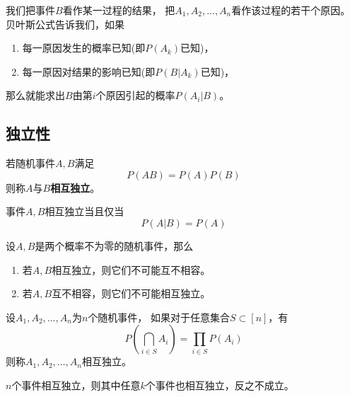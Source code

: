 \begin{remark}
  我们把事件$B$看作某一过程的结果，
  把$A_1,A_2,\dots,A_n$看作该过程的若干个原因。
  贝叶斯公式告诉我们，如果
  \begin{enumerate}
    \item
    每一原因发生的概率已知(即$P(A_k)$已知)，
    \item
    每一原因对结果的影响已知(即$P(B|A_k)$已知)，
  \end{enumerate}
  那么就能求出$B$由第$i$个原因引起的概率$P(A_i|B)$。
\end{remark}

\subsection{独立性}
\begin{definition}[两个随机事件的相互独立性]
  若随机事件$A,B$满足
  \begin{displaymath}
    P(AB)=P(A)P(B)
  \end{displaymath}
  则称$A$与$B$\textbf{相互独立}。
\end{definition}

\begin{theorem}[两个随机事件相互独立的充要条件]
  事件$A,B$相互独立当且仅当
  \begin{displaymath}
    P(A|B) = P(A)
  \end{displaymath}
\end{theorem}

\begin{theorem}[相互独立与互不相容的关系]
  设$A,B$是两个概率不为零的随机事件，那么
  \begin{enumerate}
    \item 
    若$A,B$相互独立，则它们不可能互不相容。
    \item 
    若$A,B$互不相容，则它们不可能相互独立。
  \end{enumerate}
\end{theorem}

\begin{definition}[$n$个事件的相互独立性]
  设$A_1,A_2,\dots,A_n$为$n$个随机事件，
  如果对于任意集合$S \subset[n]$，有
  \begin{displaymath}
    P\left(\bigcap_{i\in S} A_i\right) = \prod_{i\in S}P(A_i)
  \end{displaymath}
  则称$A_1,A_2,\dots,A_n$相互独立。
\end{definition}

\begin{remark}
  $n$个事件相互独立，则其中任意$k$个事件也相互独立，反之不成立。
\end{remark}
